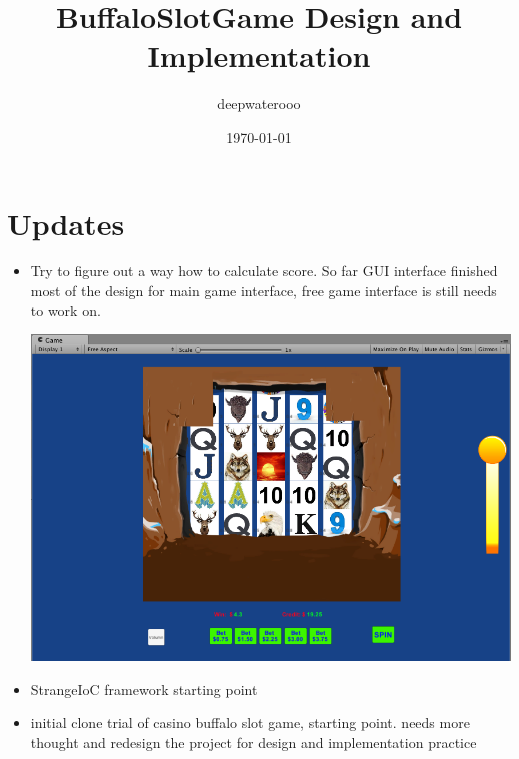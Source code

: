 \documentclass[9pt, b5paper]{article}
\author{deepwaterooo}
\date{\today}
\title{BuffaloSlotGame Design and Implementation}
\begin{document}
\maketitle
\tableofcontents


\section{Updates}
\label{sec-1}
\begin{itemize}
\item Try to figure out a way how to calculate score. So far GUI interface finished most of the design for main game interface, free game interface is still needs to work on. 

\includegraphics[width=.9\linewidth]{./pic/snapshot.png}
\item StrangeIoC framework starting point
\item initial clone trial of casino buffalo slot game, starting point. needs more thought and redesign the project for design and implementation practice
\end{itemize}
\end{document}
